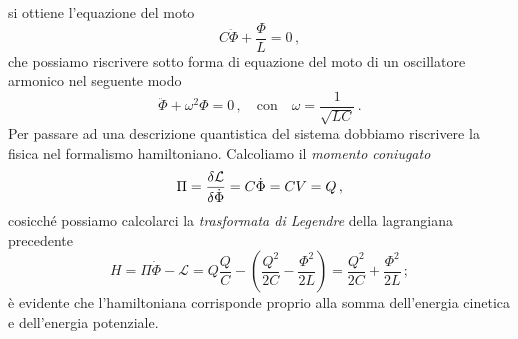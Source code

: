 si ottiene l'equazione del moto
\begin{equation*}
    C\ddot{\Phi}+\frac{\Phi}{L}=0 \, ,
\end{equation*}
che possiamo riscrivere sotto forma di equazione del moto di un oscillatore armonico nel seguente modo
\begin{equation*}
    \ddot{\Phi}+\omega^2\Phi = 0 \, , \quad \text{con} \quad \omega=\frac{1}{\sqrt{LC}} \, .
\end{equation*}
Per passare ad una descrizione quantistica del sistema dobbiamo riscrivere la fisica nel formalismo hamiltoniano. Calcoliamo il \textit{momento coniugato}
\begin{equation*}
    \Pi = \fdv{\mathcal{L}}{\dot{\Phi}} = C\dot{\Phi} = CV = Q\, ,
\end{equation*}
cosicché possiamo calcolarci la \textit{trasformata di Legendre} della lagrangiana precedente
\begin{equation}\label{eq:ham-LC}
        H = \Pi\dot{\Phi} - \mathcal{L} = Q\frac QC - \left(\frac{Q^2}{2C}-\frac{\Phi^2}{2L}\right) = \frac{Q^2}{2C} + \frac{\Phi^2}{2L} \, ;
\end{equation}
è evidente che l'hamiltoniana corrisponde proprio alla somma dell'energia cinetica e dell'energia potenziale.

